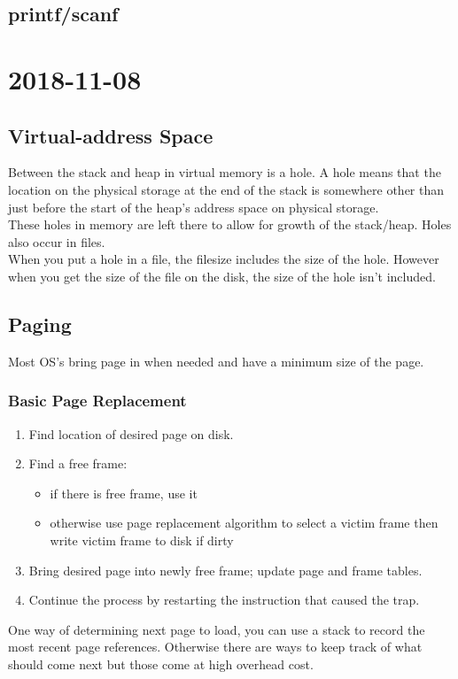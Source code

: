 \documentclass{report}
\newcommand{\mychapter}[2]{
	\setcounter{chapter}{#1}
	\setcounter{section}{0}
	\chapter*{#2}
	\addcontentsline{toc}{chapter}{#2}
}
\begin{document}
\section{printf/scanf}


\mychapter{9}{2018-11-08}
\section{Virtual-address Space}
Between the stack and heap in virtual memory is a hole. A hole means that the location on the physical storage at the end of the stack is somewhere other than just before the start of the heap's address space on physical storage.\\

These holes in memory are left there to allow for growth of the stack/heap. Holes also occur in files.\\

When you put a hole in a file, the filesize includes the size of the hole. However when you get the size of the file on the disk, the size of the hole isn't included.

\section{Paging}
Most OS's bring page in when needed and have a minimum size of the page.\\

\subsection{Basic Page Replacement}
\begin{enumerate}
\item Find location of desired page on disk.
\item Find a free frame:
	\begin{itemize}
	\item if there is free frame, use it 
	\item otherwise use page replacement algorithm to select a victim frame then write victim frame to disk if dirty
	\end{itemize}
\item Bring desired page into newly free frame; update page and frame tables.
\item Continue the process by restarting the instruction that caused the trap.
\end{enumerate}

One way of determining next page to load, you can use a stack to record the most recent page references. Otherwise there are ways to keep track of what should come next but those come at high overhead cost.\\
\end{document}
